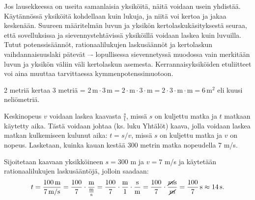 Jos lausekkeessa on useita samanlaisia yksiköitä, näitä voidaan usein yhdistää. Käytännössä yksiköitä kohdellaan kuin lukuja, ja niitä voi kertoa ja jakaa keskenään. Suureen määritelmän luvun ja yksikön kertolaskukäsityksestä seuraa, että sovelluksissa ja sievennystehtävissä yksiköillä voidaan laskea kuin luvuilla. Tutut potenssisäännöt, rationaalilukujen laskusäännöt ja kertolaskun vaihdannaisuuslaki pätevät –- lopullisessa sievennetyssä muodossa vain merkitään luvun ja yksikön väliin väli kertolaskun asemesta. Kerrannaisyksiköiden etuliitteet voi aina muuttaa tarvittaessa kymmenpotenssimuotoon.

\begin{esimerkki}
2 metriä kertaa 3 metriä = $2\,\text{m} \cdot 3\,\text{m} = 2 \cdot \text{m} \cdot 3 \cdot \text{m}= 2 \cdot 3 \cdot \text{m} \cdot \text{m} =6\,\text{m}^2$ eli kuusi neliömetriä.
\end{esimerkki}

%
%
%	
%

%
%
%	


\begin{esimerkki}
Keskinopeus $v$ voidaan laskea kaavasta $\frac{\text{s}}{\text{t}}$, missä $s$ on kuljettu matka ja $t$ matkaan käytetty aika. Tästä voidaan johtaa (ks. luku Yhtälöt) kaava, jolla voidaan laskea matkan kulkemiseen kulunut aika: $t=s/v$, missä $s$ on kuljettu matka ja $v$ on nopeus. Lasketaan, kuinka kauan kestää 300 metrin matka nopeudella 7 m/s.

Sijoitetaan kaavaan yksikköineen $s=300$ m ja $v= 7$ m/s ja käytetään rationaalilukujen laskusääntöjä, jolloin saadaan:
\[t=\frac{100\,\textrm{m}}{7\,\textrm{m/s}} = \frac{100}{7} \cdot \frac{\textrm{m}}{\frac{\textrm{m}}{\textrm{s}}} 
= \frac{100}{7} \cdot \frac{\textrm{m}}{1} \cdot \frac{\textrm{s}}{\textrm{m}}
= \frac{100}{7} \cdot \frac{\cancel{m}\textrm{s}}{\cancel{m}}
=\frac{100}{7}\,\textrm{s} \approx 14\,\textrm{s}.\]
\end{esimerkki}

